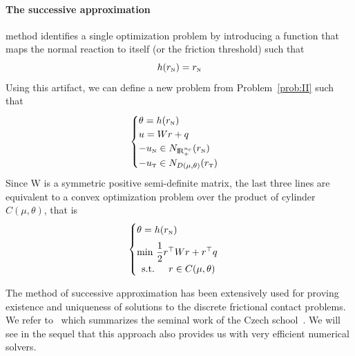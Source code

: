 \paragraph{The successive approximation} method identifies a single optimization problem by introducing a function that maps the normal reaction to itself (or the friction threshold) such that
\begin{equation}
  \label{eq:Haslinger-g}
  h(r_\n)  = r_\n
\end{equation}
Using this artifact, we can define a new problem from Problem~\ref{prob:II} such that
\begin{equation}
  \label{eq:Haslinger-1}
  \begin{cases}
    \theta = h(r_\n) \\
    u = W r + q \\
    -u_{\n} \in N_{\RR^{n_c}_+}(r_\n) \\
    -u_{\t} \in N_{D(\mu,\theta)}(r_\t)
  \end{cases}
\end{equation}
Since W is a symmetric positive semi-definite  matrix, the last three lines are equivalent to a convex optimization problem over the product of cylinder $C(\mu,\theta)$, that is
\begin{equation}
  \label{eq:Haslinger-2}
  \begin{cases}
    \theta = h(r_\n) \\[2mm]
    \min\, \Frac 1 2 r^\top W r + r^\top q \\
    \begin{array}{ll}
    \text{s.t. }& r \in C(\mu,\theta)
  \end{array}
  \end{cases}
\end{equation}

The method of successive approximation has been extensively used for proving existence and uniqueness of solutions to the discrete frictional contact problems. We refer to~\cite{Haslinger.ea1996} which summarizes the seminal work of the Czech school~\cite{Necas.ea1980,Haslinger1983,Haslinger1984}. We will see in the sequel that this approach also provides us with very efficient numerical solvers.

